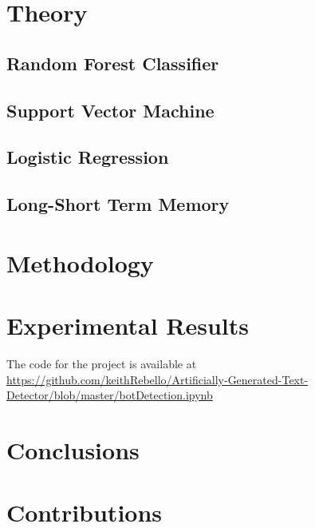 \documentclass[12pt]{article}
\begin{document}
\section{Theory}
\subsection{Random Forest Classifier}
\subsection{Support Vector Machine}
\subsection{Logistic Regression}
\subsection{Long-Short Term Memory}
\section{Methodology}
\section{Experimental Results}
The code for the project is available at \url{https://github.com/keithRebello/Artificially-Generated-Text-Detector/blob/master/botDetection.ipynb}
\section{Conclusions}
\section{Contributions}



\end{document}
